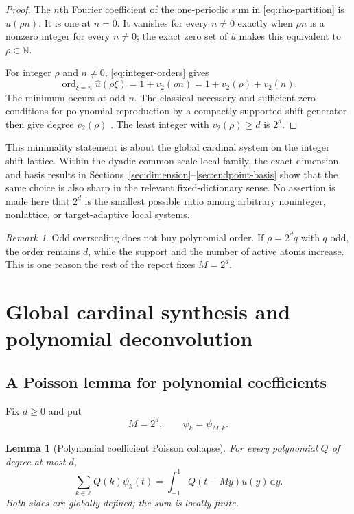 \documentclass[11pt,oneside]{article}
\newtheorem{lemma}[theorem]{Lemma}
\theoremstyle{definition}
\theoremstyle{remark}
\newtheorem{remark}[theorem]{Remark}
\newcommand{\Z}{\mathbb Z}
\newcommand{\N}{\mathbb N}
\newcommand{\dd}{\,\mathrm d}
\newcommand{\ord}{\operatorname{ord}}
\newcommand{\vtwo}{v_2}
\begin{document}
\begin{proof}
The $n$th Fourier coefficient of the one-periodic sum in \eqref{eq:rho-partition} is $\widehat u(\rho n)$.  It is one at $n=0$.  It vanishes for every $n\ne0$ exactly when $\rho n$ is a nonzero integer for every $n\ne0$; the exact zero set of $\widehat u$ makes this equivalent to $\rho\in\N$.

For integer $\rho$ and $n\ne0$, \eqref{eq:integer-orders} gives
\[
 \ord_{\xi=n}\widehat u(\rho\xi)
 =1+\vtwo(\rho n)
 =1+\vtwo(\rho)+\vtwo(n).
\]
The minimum occurs at odd $n$.  The classical necessary-and-sufficient zero conditions for polynomial reproduction by a compactly supported shift generator then give degree $\vtwo(\rho)$ \cite{strangfix1973,jia1998}.  The least integer with $\vtwo(\rho)\ge d$ is $2^d$.
\end{proof}

This minimality statement is about the global cardinal system on the integer shift lattice.  Within the dyadic common-scale local family, the exact dimension and basis results in Sections~\ref{sec:dimension}--\ref{sec:endpoint-basis} show that the same choice is also sharp in the relevant fixed-dictionary sense.  No assertion is made here that $2^d$ is the smallest possible ratio among arbitrary noninteger, nonlattice, or target-adaptive local systems.

\begin{remark}
Odd overscaling does not buy polynomial order.  If $\rho=2^dq$ with $q$ odd, the order remains $d$, while the support and the number of active atoms increase.  This is one reason the rest of the report fixes $M=2^d$.
\end{remark}

\section{Global cardinal synthesis and polynomial deconvolution}

\subsection{A Poisson lemma for polynomial coefficients}
Fix $d\ge0$ and put
\begin{equation}
 M=2^d,\qquad \psi_k=\psi_{M,k}.                           \label{eq:M-psi}
\end{equation}

\begin{lemma}[Polynomial coefficient Poisson collapse]
\label{lem:poisson-collapse}
For every polynomial $Q$ of degree at most $d$,
\begin{equation}
 \sum_{k\in\Z}Q(k)\psi_k(t)
 =\int_{-1}^{1}Q(t-My)u(y)\dd y.                          \label{eq:poisson-collapse}
\end{equation}
Both sides are globally defined; the sum is locally finite.
\end{lemma}
\end{document}
